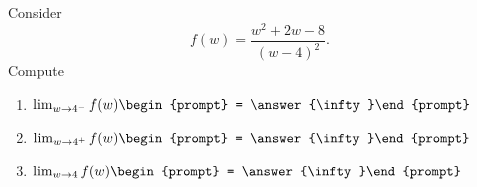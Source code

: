 \documentclass{ximera}
\author{Bart Snapp}
\begin{document}
\begin{exercise}
Consider 
\[
f(w) = \frac{w^2+2 w-8}{(w-4)^2}.
\]
Compute
\begin{enumerate}
\item $\lim_{w\to 4^- } f(w) \begin{prompt} = \answer{\infty}\end{prompt}$
\item $\lim_{w\to 4^+ } f(w) \begin{prompt} = \answer{\infty}\end{prompt}$
\item $\lim_{w\to 4 } f(w) \begin{prompt} = \answer{\infty}\end{prompt}$
\end{enumerate}
\end{exercise}
\end{document}
